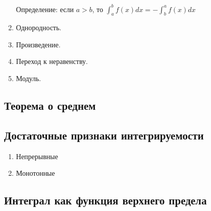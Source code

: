 \documentclass[11pt]{article}
\begin{document}
\begin{enumerate}
            Определение: если $a > b$, то $\int_{a}^{b}f(x)dx = -\int_{b}^{a}f(x)dx$
            \item Однородность.\\
            
            \item Произведение.\\
            
            \item Переход к неравенству.\\
            
            \item Модуль.\\
            
        \end{enumerate}

        \subsection{Теорема о среднем}

        \subsection{Достаточные признаки интегрируемости}
        \begin{enumerate}
            \item Непрерывные
            
            \item Монотонные
            
        \end{enumerate}

        \subsection{Интеграл как функция верхнего предела}
\end{document}
